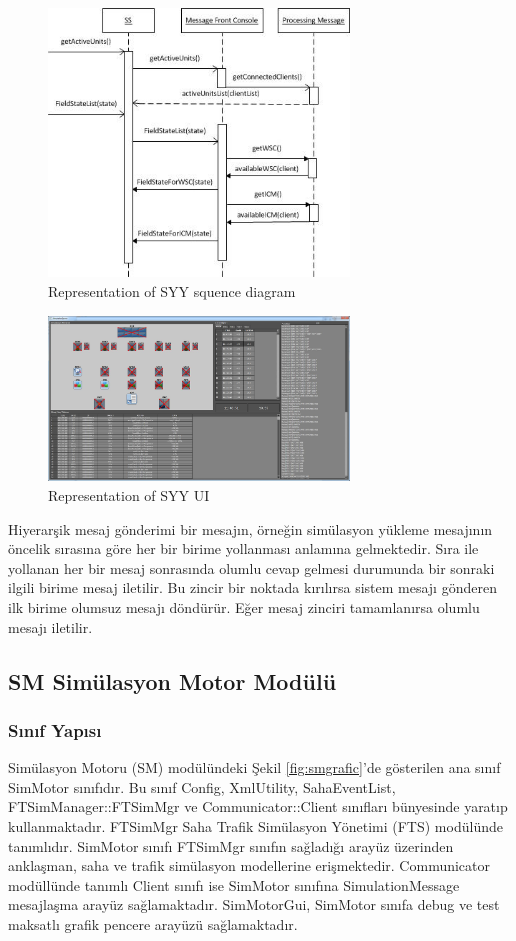\documentclass[conference]{IEEEtran}
\begin{document}
\begin{figure}[h!]
  \centering
  \includegraphics[width=8cm]{syySequenceDiagram.jpg}
  \caption{Representation of SYY squence diagram}\label{fig:syySequenceDiagram}
\end{figure}


\begin{figure}[h!]
  \centering
  \includegraphics[width=8cm]{syygrafic.jpg}
  \caption{Representation of SYY UI}\label{fig:syygrafic}
\end{figure}




Hiyerarşik mesaj gönderimi bir mesajın, örneğin simülasyon yükleme mesajının öncelik sırasına göre her bir birime yollanması anlamına gelmektedir. Sıra ile yollanan her bir mesaj sonrasında olumlu cevap gelmesi durumunda bir sonraki ilgili birime mesaj iletilir. Bu zincir bir noktada kırılırsa sistem mesajı gönderen ilk birime olumsuz mesajı döndürür. Eğer mesaj zinciri tamamlanırsa olumlu mesajı iletilir.

\subsection{SM Simülasyon Motor Modülü}
\subsubsection{Sınıf Yapısı}
Simülasyon Motoru (SM) modülündeki Şekil \ref{fig:smgrafic}'de gösterilen ana sınıf SimMotor sınıfıdır. Bu sınıf Config, XmlUtility, SahaEventList, FTSimManager::FTSimMgr ve Communicator::Client sınıfları bünyesinde yaratıp kullanmaktadır. FTSimMgr Saha Trafik Simülasyon Yönetimi (FTS) modülünde tanımlıdır. SimMotor sınıfı FTSimMgr sınıfın sağladığı arayüz üzerinden anklaşman, saha ve trafik simülasyon modellerine erişmektedir. Communicator modüllünde tanımlı Client sınıfı ise SimMotor sınıfına SimulationMessage mesajlaşma arayüz sağlamaktadır. SimMotorGui, SimMotor sınıfa debug ve test maksatlı grafik pencere arayüzü sağlamaktadır.
\end{document}
